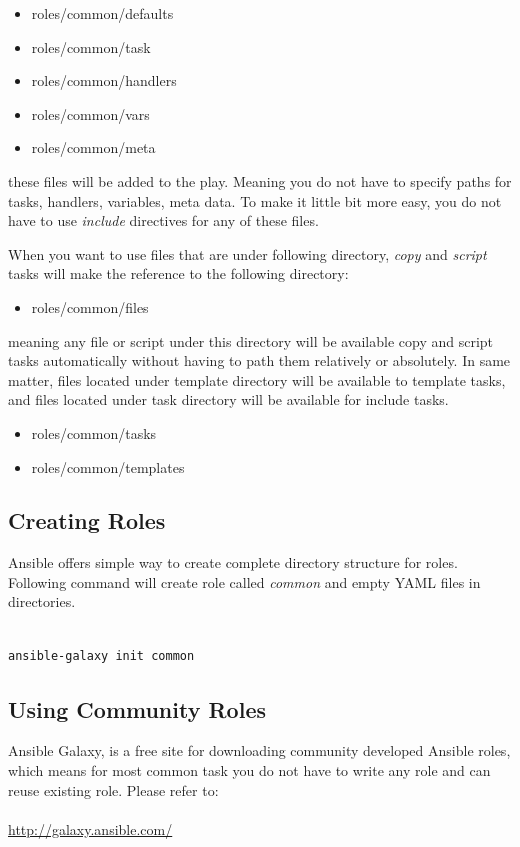 \documentclass[10pt]{book}
\begin{document}
 
 \begin{itemize}
\item roles/common/defaults
\item roles/common/task
\item roles/common/handlers
\item roles/common/vars
\item roles/common/meta
\end{itemize}

these files will be added to the play. Meaning you do not have to specify paths for tasks, handlers, 
variables, meta data. To make it little bit more easy, you do not have to use 
\emph{include} directives for any of these files.

When you want to use files that are under following directory, \emph{copy} and 
\emph{script} tasks will make the reference to the following directory:

\begin{itemize}
\item roles/common/files
\end{itemize}

meaning any file or script under this directory will be available copy and script tasks automatically without 
having to path them relatively or absolutely. In same matter, files located
under template directory will be available to template tasks, and files located 
under task directory will be available for include tasks.

\begin{itemize}
\item roles/common/tasks
\item roles/common/templates
\end{itemize}


\subsection{Creating Roles}
Ansible offers simple way to create complete directory structure for roles. 
Following command will create role called \emph{common} and empty YAML files in directories. 

\begin{Verbatim} 
 
ansible-galaxy init common

\end{Verbatim}


\subsection{Using Community Roles}
Ansible Galaxy, is a free site for downloading community developed Ansible 
roles, which means for most common task you do not have to write any role and 
can reuse existing role. Please refer to:
\\
\\
\url{http://galaxy.ansible.com/}
\end{document}
